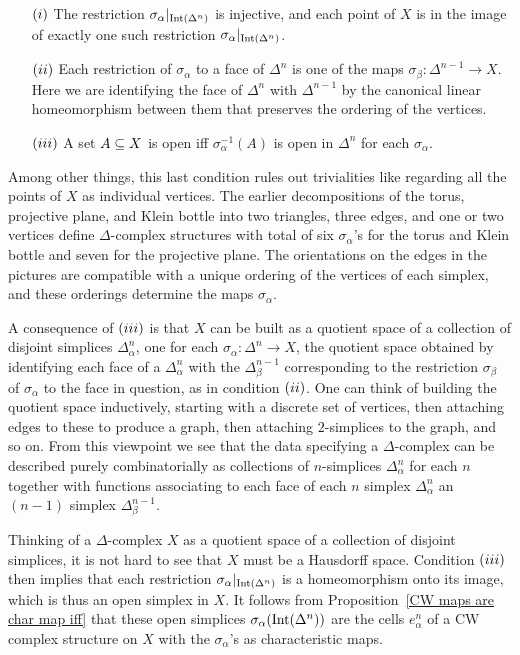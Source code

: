 \begin{itemize}
\item[$(\rmnum{1})$]The restriction $\sigma_\alpha|_{\mathrm{Int}(\Delta^n)}$ is injective, and each point of $X$ is in the image of exactly
one such restriction $\sigma_\alpha|_{\mathrm{Int}(\Delta^n)}$.
\item[$(\rmnum{2})$]Each restriction of $\sigma_\alpha$ to a face of $\Delta^n$ is one of the maps $\sigma_\beta:\Delta^{n-1}\to X$. Here we are identifying the face of $\Delta^n$ with $\Delta^{n-1}$ by the canonical linear homeomorphism between them that preserves the ordering of the vertices.
\item[$(\rmnum{3})$]A set $A\subseteq X$ is open iff $\sigma^{-1}_\alpha(A)$ is open in $\Delta^n$ for each $\sigma_\alpha$.
\end{itemize}
Among other things, this last condition rules out trivialities like regarding all the points of $X$ as individual vertices. The earlier decompositions of the torus, projective plane, and Klein bottle into two triangles, three edges, and one or two vertices define $\Delta$-complex structures with   total of six $\sigma_\alpha$'s for the torus and Klein bottle and seven for the projective plane. The orientations on the edges in the pictures are compatible with a unique ordering of the vertices of each simplex, and these orderings determine the maps $\sigma_\alpha$.\par
A consequence of $(\rmnum{3})$ is that $X$ can be built as a quotient space of a collection of disjoint simplices $\Delta^n_\alpha$, one for each $\sigma_\alpha:\Delta^n\to X$, the quotient space obtained by identifying each face of a $\Delta^n_\alpha$ with the $\Delta_\beta^{n-1}$ corresponding to the restriction $\sigma_\beta$ of $\sigma_\alpha$ to the face in question, as in condition $(\rmnum{2})$. One can think of building the quotient space inductively, starting with a discrete set of vertices, then attaching edges to
these to produce a graph, then attaching $2$-simplices to the graph, and so on. From this viewpoint we see that the data specifying a $\Delta$-complex can be described purely combinatorially as collections of $n$-simplices $\Delta^n_\alpha$ for each $n$ together with functions associating to each face of each $n$ simplex $\Delta^n_\alpha$ an $(n-1)$ simplex $\Delta^{n-1}_\beta$.\par
Thinking of a $\Delta$-complex $X$ as a quotient space of a collection of disjoint simplices, it is not hard to see that $X$ must be a Hausdorff space. Condition $(\rmnum{3})$ then implies that each restriction $\sigma_\alpha|_{\mathrm{Int}(\Delta^n)}$ is a homeomorphism onto its image, which is
thus an open simplex in $X$. It follows from Proposition~\ref{CW maps are char map iff} that these open simplices $\sigma_\alpha(\mathrm{Int}(\Delta^n))$ are the cells 
$e^n_\alpha$ of a CW complex structure on $X$ with the $\sigma_\alpha$'s as characteristic maps.
